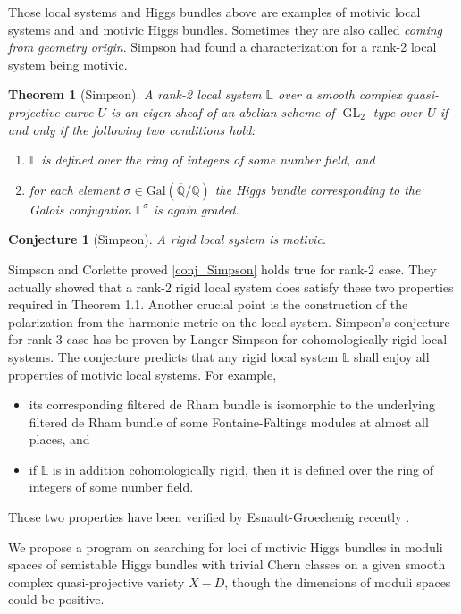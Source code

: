 \documentclass[12pt,twoside]{book}
\theoremstyle{plain}
\newtheorem{theorem}{Theorem}[section]
\newtheorem{conjecture}[conjecture]{Conjecture}
\theoremstyle{definition}
\theoremstyle{remark}
\newcommand{\bL}{{\mathbb L}}
\DeclareMathOperator\GL{GL}
\numberwithin{equation}{section}
\begin{document}
Those  local systems and Higgs bundles above are examples of    motivic local systems and and motivic Higgs bundles.
 Sometimes they are also called \emph{coming from geometry origin}. Simpson had found a characterization for a rank-2 local system being motivic.
\begin{theorem}[Simpson\cite{Sim92}] \label{thm_Simpson}
A rank-2 local system $\mathbb L$ over a smooth complex quasi-projective curve $U$ is an eigen sheaf of
an abelian scheme of $\GL_2$-type over $U$ if and only if the following two conditions hold:
\begin{enumerate}
\item $\mathbb L$ is defined over the ring of integers of some number field, and
\item for each element $\sigma \in \mathrm{Gal}(\overline{\mathbb Q}/\mathbb Q)$
the Higgs bundle corresponding to the Galois conjugation $\mathbb L^\sigma$ is again graded.
\end{enumerate}
\end{theorem}
\begin{conjecture}[Simpson] \label{conj_Simpson}
A rigid local system is motivic.
\end{conjecture}
Simpson and Corlette  \cite{KeSi08}  proved \autoref{conj_Simpson} holds true for rank-$2$ case. They actually showed that a rank-2 rigid local system does satisfy these two properties required in Theorem 1.1.  Another  crucial point is the construction of the polarization from the harmonic metric on the local system.  
Simpson's conjecture for rank-3 case has be proven by Langer-Simpson \cite{LaSi18} for cohomologically rigid local systems. The conjecture predicts that any rigid local system $\bL$ shall enjoy all properties of motivic local systems. For example,
\begin{itemize}
\item its corresponding filtered de Rham bundle is isomorphic to the underlying filtered de Rham bundle of some Fontaine-Faltings modules at almost all places, and
\item if $\bL$ is in addition cohomologically rigid, then it is defined over the ring of integers of some number field.

\end{itemize}
Those two properties have been verified by Esnault-Groechenig recently \cite{EsGr18,EsGr20}.

We propose a program  on searching for loci of motivic Higgs bundles in moduli spaces of semistable  Higgs bundles   with trivial Chern classes on a  given smooth  complex quasi-projective variety $X-D$, though the dimensions of moduli spaces could be positive.
\end{document}
